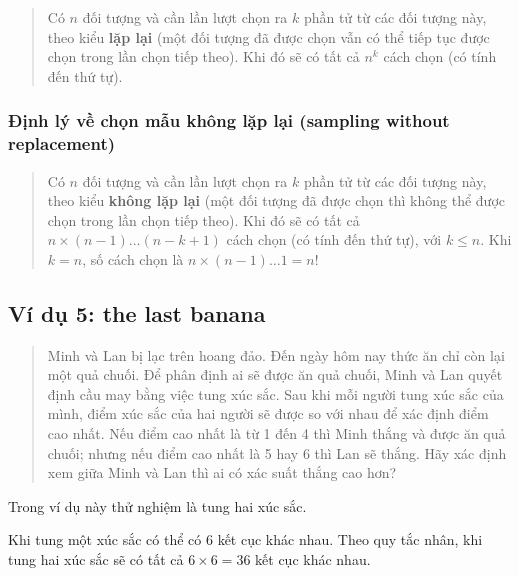 \documentclass[
]{book}
\begin{document}
\begin{quote}
Có \(n\) đối tượng và cần lần lượt chọn ra \(k\) phần tử từ các đối tượng này, theo kiểu \textbf{lặp lại} (một đối tượng đã được chọn vẫn có thể tiếp tục được chọn trong lần chọn tiếp theo). Khi đó sẽ có tất cả \(n^k\) cách chọn (có tính đến thứ tự).
\end{quote}

\hypertarget{ux111ux1ecbnh-luxfd-vux1ec1-chux1ecdn-mux1eabu-khuxf4ng-lux1eb7p-lux1ea1i-sampling-without-replacement}{%
\subsubsection{Định lý về chọn mẫu không lặp lại (sampling without replacement)}\label{ux111ux1ecbnh-luxfd-vux1ec1-chux1ecdn-mux1eabu-khuxf4ng-lux1eb7p-lux1ea1i-sampling-without-replacement}}

\begin{quote}
Có \(n\) đối tượng và cần lần lượt chọn ra \(k\) phần tử từ các đối tượng này, theo kiểu \textbf{không lặp lại} (một đối tượng đã được chọn thì không thể được chọn trong lần chọn tiếp theo). Khi đó sẽ có tất cả \(n \times (n-1) \ldots (n-k+1)\) cách chọn (có tính đến thứ tự), với \(k \leq n\). Khi \(k=n\), số cách chọn là \(n \times (n-1) \ldots 1 = n!\)
\end{quote}

\hypertarget{vuxed-dux1ee5-5-the-last-banana}{%
\subsection{Ví dụ 5: the last banana}\label{vuxed-dux1ee5-5-the-last-banana}}

\begin{quote}
Minh và Lan bị lạc trên hoang đảo. Đến ngày hôm nay thức ăn chỉ còn lại một quả chuối. Để phân định ai sẽ được ăn quả chuối, Minh và Lan quyết định cầu may bằng việc tung xúc sắc. Sau khi mỗi người tung xúc sắc của mình, điểm xúc sắc của hai người sẽ được so với nhau để xác định điểm cao nhất. Nếu điểm cao nhất là từ 1 đến 4 thì Minh thắng và được ăn quả chuối; nhưng nếu điểm cao nhất là 5 hay 6 thì Lan sẽ thắng. Hãy xác định xem giữa Minh và Lan thì ai có xác suất thắng cao hơn?
\end{quote}

Trong ví dụ này thử nghiệm là tung hai xúc sắc.

Khi tung một xúc sắc có thể có 6 kết cục khác nhau. Theo quy tắc nhân, khi tung hai xúc sắc sẽ có tất cả \(6 \times 6 = 36\) kết cục khác nhau.
\end{document}
